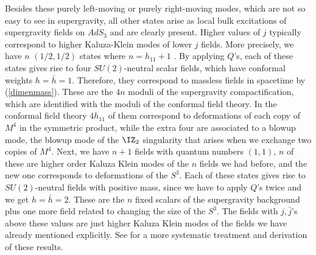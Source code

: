 Besides these purely left-moving or purely right-moving modes,
which are not so easy to see in supergravity,
all other states arise as local bulk  excitations
of  supergravity fields on $AdS_3$ and are clearly present. 
Higher values of $j$ typically correspond to higher Kaluza-Klein 
modes of lower $j$ fields. More precisely, we have 
$n$ $(1/2,1/2) $ states where $n = h_{11} + 1$ 
\cite{Maldacena:1998bw,Deger:1998nm,deBoer:1998ip}. 
By applying $Q$'s, each of these states
gives rise to four $SU(2)$-neutral scalar fields, which
 have conformal weights
 $h = \bar h = 1$. Therefore, they correspond to 
  massless fields in spacetime
by (\ref{dimenmass}).
These are the   $ 4 n$ 
moduli of the supergravity compactification, which are identified with
the moduli of
the conformal field theory. In the conformal field theory 
$4 h_{11}$ of them correspond to deformations of each copy of $M^4$
in the symmetric product, while the extra four are associated 
to a blowup mode, the blowup mode of the $\IZ_2$ singularity that
arises when we exchange two copies of $M^4$. 
Next, we have $n+1$ fields  with 
quantum numbers $(1,1)$, $n $ of these are higher order
Kaluza Klein modes of the $n$ fields we had before, and the new one
corresponds to deformations of the $S^3$. 
Each of these states gives rise to 
$SU(2)$-neutral fields with positive mass, since we have to apply 
$Q$'s twice and we  get  $h =\bar h =2$. 
These are the $n$ fixed scalars of the supergravity background
plus one more field related to changing the size of the $S^3$. 
The fields with  $j,\bar j$'s  above these values are just higher
Kaluza Klein modes of the fields we have already mentioned 
explicitly. See \cite{Maldacena:1998bw,Deger:1998nm,deBoer:1998ip}
for a more systematic treatment and 
derivation of these results. 

